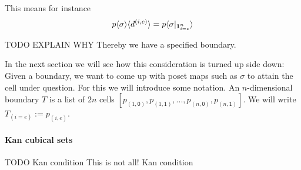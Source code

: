 \documentclass[11pt]{article}
\theoremstyle{definition}
\newcommand{\mdef}{:=}
\newcommand{\mlist}[1]{[ {#1} ]}
\newcommand{\pintrestr}[3]{\mathbf{1}^{#1}_{{#2}={#3}}}
\newcommand{\izero}{\mathsf{0}}
\newcommand{\ione}{\mathsf{1}}
\newcommand{\restrict}[2]{{#1}|_{#2}}
\newcommand{\dmap}[2]{d^{({#1} , {#2})}}
\newcommand{\cont}[2]{ \ifthenelse{\equal{#2}{}}{#1}{{#1}\langle{#2}\rangle} }
\newcommand{\comp}[2]{\mathsf{Comp}({#1}\ {#2})}
\begin{document}
This means for instance
$$\cont{\cont{p}{\sigma}}{\dmap{i}{e}} = \cont{p}{\restrict{\sigma}{\pintrestr{n}{i}{e}}}$$

TODO EXPLAIN WHY
Thereby we have a specified boundary.

In the next section we will see how this consideration is turned up side down:
Given a boundary, we want to come up with poset maps such as $\sigma$ to attain
the cell under question. For this we will introduce some notation. An
$n$-dimensional boundary $T$ is a list of $2n$ cells $\mlist{p_{(1,\izero)},
  p_{(1,\ione)} , ... , p_{(n,\izero)}, p_{(n, \ione)}}$. We will write
$T_{(i=e)} \mdef p_{(i,e)}$.

\paragraph{Kan cubical sets}


TODO Kan condition
This is not all! Kan condition








\end{document}
